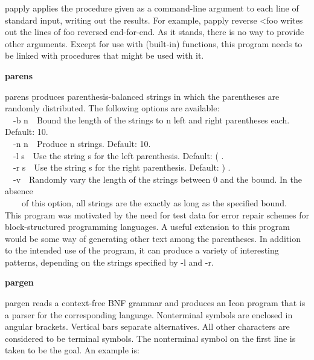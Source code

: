 {\textsf{papply} applies the procedure given as a command-line argument
to each line of standard input, writing out the results. For example,
\textsf{papply reverse {\textless}foo} writes out the lines of foo
reversed end-for-end. As it stands, there is no way to provide other
arguments. Except for use with (built-in) functions, this program needs
to be linked with procedures that might be used with it. 

{\sffamily\bfseries
parens\ \ \ \ \ \ \ \ \ \ \ \ \ \ \ \ \ \ \ \ }

\textsf{parens} produces parenthesis-balanced strings in which the
parentheses are randomly distributed. The following options are
available:\\
\ \ \textsf{{}-b n}\ \ Bound the length of the strings to n left and
right parentheses each. Default: 10.\\
\ \ \textsf{{}-n n}\ \ Produce n strings. Default: 10.\\
\ \ \textsf{{}-l s}\ \ Use the string s for the left parenthesis.
Default: \textsf{{\textquotedbl}({\textquotedbl}} .\\
\ \ \textsf{{}-r s}\ \ Use the string s for the right parenthesis.
Default: \textsf{{\textquotedbl}){\textquotedbl} }.\\
\ \ \textsf{{}-v}\ \ Randomly vary the length of the strings between 0
and the bound. In the absence\\
\ \ \ \ of this option, all strings are the exactly as long as the
specified bound.\\
This program was motivated by the need for test data for error repair
schemes for block-structured programming languages. A useful extension
to this program would be some way of generating other text among the
parentheses. In addition to the intended use of the program, it can
produce a variety of interesting patterns, depending on the strings
specified by \textsf{{}-l} and \textsf{{}-r}.

{\sffamily\bfseries
pargen\ \ \ \ \ \ \ \ \ \ \ \ \ \ \ \ \ \ \ \ }

\textsf{pargen} reads a context-free BNF grammar and produces an Icon
program that is a parser for the corresponding language. Nonterminal
symbols are enclosed in angular brackets. Vertical bars separate
alternatives. All other characters are considered to be terminal
symbols. The nonterminal symbol on the first line is taken to be the
goal. An example is:


}
